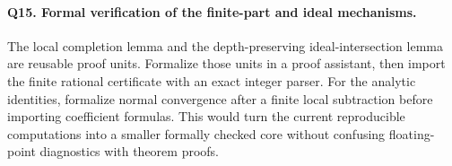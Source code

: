 \paragraph{Q15. Formal verification of the finite-part and ideal mechanisms.}
The local completion lemma and the depth-preserving ideal-intersection
lemma are reusable proof units. Formalize those units in a proof
assistant, then import the finite rational certificate with an exact
integer parser. For the analytic identities, formalize normal
convergence after a finite local subtraction before importing
coefficient formulas. This would turn the current reproducible
computations into a smaller formally checked core without confusing
floating-point diagnostics with theorem proofs.
